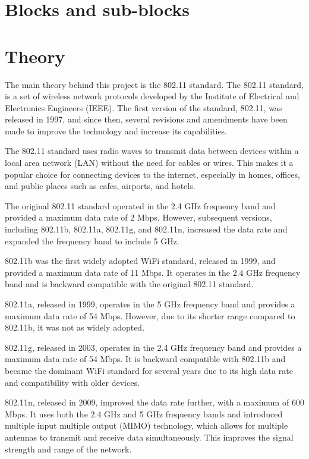 \section{Blocks and sub-blocks}



\section{Theory}
The main theory behind this project is the 802.11 standard.
The 802.11 standard, is a set of wireless network protocols developed by the Institute of Electrical and Electronics Engineers (IEEE). The first version of the standard, 802.11, was released in 1997, and since then, several revisions and amendments have been made to improve the technology and increase its capabilities.

The 802.11 standard uses radio waves to transmit data between devices within a local area network (LAN) without the need for cables or wires. This makes it a popular choice for connecting devices to the internet, especially in homes, offices, and public places such as cafes, airports, and hotels.

The original 802.11 standard operated in the 2.4 GHz frequency band and provided a maximum data rate of 2 Mbps. However, subsequent versions, including 802.11b, 802.11a, 802.11g, and 802.11n, increased the data rate and expanded the frequency band to include 5 GHz.

802.11b was the first widely adopted WiFi standard, released in 1999, and provided a maximum data rate of 11 Mbps. It operates in the 2.4 GHz frequency band and is backward compatible with the original 802.11 standard.

802.11a, released in 1999, operates in the 5 GHz frequency band and provides a maximum data rate of 54 Mbps. However, due to its shorter range compared to 802.11b, it was not as widely adopted.

802.11g, released in 2003, operates in the 2.4 GHz frequency band and provides a maximum data rate of 54 Mbps. It is backward compatible with 802.11b and became the dominant WiFi standard for several years due to its high data rate and compatibility with older devices.

802.11n, released in 2009, improved the data rate further, with a maximum of 600 Mbps. It uses both the 2.4 GHz and 5 GHz frequency bands and introduced multiple input multiple output (MIMO) technology, which allows for multiple antennas to transmit and receive data simultaneously. This improves the signal strength and range of the network.


